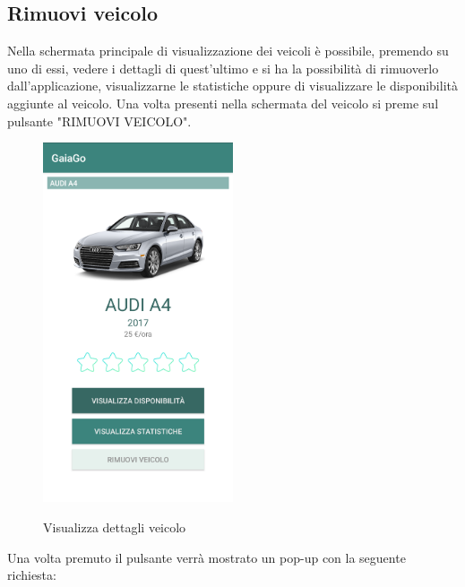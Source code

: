 \subsection{Rimuovi veicolo}
Nella schermata principale di visualizzazione dei veicoli è possibile, premendo su uno di essi, vedere i dettagli di quest'ultimo e si ha la possibilità di rimuoverlo dall'applicazione, visualizzarne le statistiche oppure di visualizzare le disponibilità aggiunte al veicolo. Una volta presenti nella schermata del veicolo si preme sul pulsante "RIMUOVI VEICOLO".
\begin{figure}[H] 
	\centering 
	\includegraphics[width=0.5\textwidth]{res/images/visualizza_dettagli.png}\\
	\caption{Visualizza dettagli veicolo}
	\label{rimozione}
\end{figure}
\pagebreak
Una volta premuto il pulsante verrà mostrato un pop-up con la seguente richiesta:
